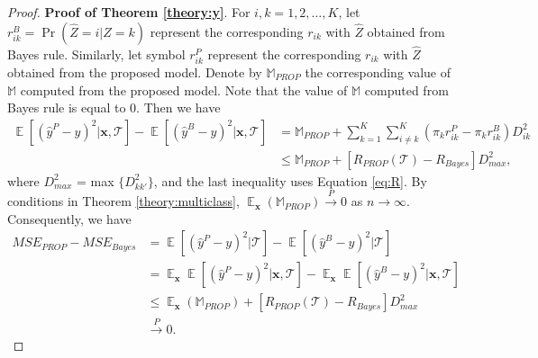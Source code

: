 \documentclass[10pt,a4paper]{amsart}
\DeclareMathOperator{\E}{\mathbb{E}}
\begin{document}
\begin{proof}{\textbf{Proof of Theorem \ref{theory:y}}.}{}
For $i,k = 1, 2, \ldots, K$, let $r_{ik}^{B} = \Pr(\hat{Z}=i|Z=k)$ represent the corresponding $r_{ik}$ with $\hat{Z}$ obtained from Bayes rule.
Similarly, let symbol $r_{ik}^{P}$ represent the corresponding $r_{ik}$ with $\hat{Z}$ obtained from the proposed model.
Denote by $\mathbb{M}_{PROP}$ the corresponding value of $\mathbb{M}$ computed from the proposed model.
Note that the value of $\mathbb{M}$ computed from Bayes rule is equal to 0.
Then we have
\begin{align*}
\E[(\hat{y}^{P}-y)^2|\bm x, \mathcal{T}] - \E[(\hat{y}^{B}-y)^2|\bm x, \mathcal{T}]
&= \mathbb{M}_{PROP} + \sum_{k=1}^K \sum_{i \neq k}^K (\pi_k r_{ik}^{P} - \pi_k r_{ik}^{B}) D_{ik}^2    \\
&\leq  \mathbb{M}_{PROP} + [R_{PROP}(\mathcal{T}) - R_{Bayes}] D_{max}^2,
\end{align*}
where $D_{max}^2$ = max $\{ D_{kk'}^2 \}$, and the last inequality uses Equation \eqref{eq:R}.
By conditions in Theorem \ref{theory:multiclass}, $\E_{\bm x}(\mathbb{M}_{PROP}) \stackrel{P}{\rightarrow} 0$ as $n \rightarrow \infty$.
Consequently, we have
\begin{align*}
MSE_{PROP} - MSE_{Bayes} &= \E[(\hat{y}^{P}-y)^2|\mathcal{T}] - \E[(\hat{y}^{B}-y)^2|\mathcal{T}] \\
&= \E_{\bm x}\E[(\hat{y}^{P}-y)^2|\bm x, \mathcal{T}] - \E_{\bm x}\E[(\hat{y}^{B}-y)^2|\bm x, \mathcal{T}]  \\
& \leq \E_{\bm x}(\mathbb{M}_{PROP}) + [R_{PROP}(\mathcal{T}) - R_{Bayes}] D_{max}^2 \\
& \stackrel{P}{\rightarrow} 0.
\end{align*}



\end{proof}
\end{document}
